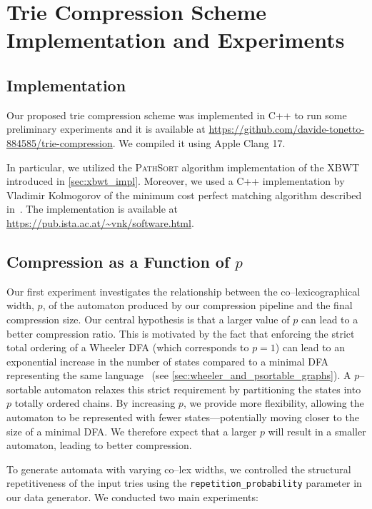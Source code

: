 \section{Trie Compression Scheme Implementation and Experiments}

\subsection{Implementation}
Our proposed trie compression scheme was implemented in C++ to run some preliminary experiments and it is available at \url{https://github.com/davide-tonetto-884585/trie-compression}. We compiled it using Apple Clang 17. 

In particular, we utilized the \textsc{PathSort} algorithm implementation of the XBWT introduced in \cref{sec:xbwt_impl}. Moreover, we used a C++ implementation by Vladimir Kolmogorov of the minimum cost perfect matching algorithm described in~\cite{kolmogorovBlossomNewImplementation2009}. The implementation is available at \url{https://pub.ista.ac.at/~vnk/software.html}.

\subsection{Compression as a Function of \texorpdfstring{$p$}{p}}
Our first experiment investigates the relationship between the co--lexicographical width, $p$, of the automaton produced by our compression pipeline and the final compression size. Our central hypothesis is that a larger value of $p$ can lead to a better compression ratio. This is motivated by the fact that enforcing the strict total ordering of a Wheeler DFA (which corresponds to $p=1$) can lead to an exponential increase in the number of states compared to a minimal DFA representing the same language~\cite{manziniRationalConstructionWheeler2024} (see \cref{sec:wheeler_and_psortable_graphs}). A $p$--sortable automaton relaxes this strict requirement by partitioning the states into $p$ totally ordered chains. By increasing $p$, we provide more flexibility, allowing the automaton to be represented with fewer states—potentially moving closer to the size of a minimal DFA. We therefore expect that a larger $p$ will result in a smaller automaton, leading to better compression.

To generate automata with varying co--lex widths, we controlled the structural repetitiveness of the input tries using the \texttt{repetition\_probability} parameter in our data generator. We conducted two main experiments:

